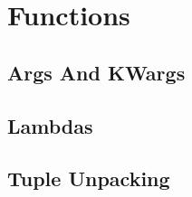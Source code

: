 \section{Functions}
  
  \subsection{Args And KWargs}

  \subsection{Lambdas}

  \subsection{Tuple Unpacking}